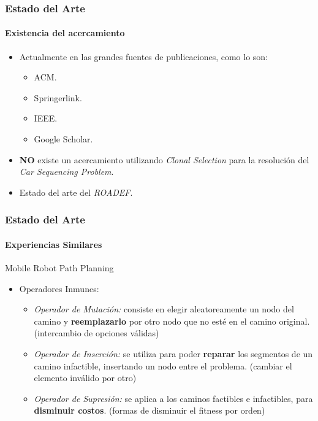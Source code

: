 
\frame
{
\frametitle{Estado del Arte}
\framesubtitle{Existencia del acercamiento}
\begin{itemize}
	\item Actualmente en las grandes fuentes de publicaciones, como lo son:
	\begin{itemize}
		\item ACM.
		\item Springerlink.
		\item IEEE.
		\item Google Scholar.
	\end{itemize}
	\item \textbf{NO} existe un acercamiento utilizando \emph{Clonal Selection}
		para la resolución del \emph{Car Sequencing Problem}.
	\item Estado del arte del \emph{ROADEF}.
\end{itemize}
}

\frame
{
\frametitle{Estado del Arte}
\framesubtitle{Experiencias Similares}
\begin{block}{Mobile Robot Path Planning}
\begin{itemize}
	\item Operadores Inmunes:
	 \begin{itemize}
	 	\item \emph{Operador de Mutación:}
			consiste en elegir aleatoreamente un nodo del camino y \textbf{reemplazarlo} por otro nodo que no esté en el camino original. (intercambio de opciones válidas)
		\item \emph{Operador de Inserción:}
			se utiliza para poder \textbf{reparar} los segmentos de un camino infactible, insertando un nodo entre el problema. (cambiar el elemento inválido por otro)
		\item \emph{Operador de Supresión:}
			se aplica a los caminos factibles e infactibles, para \textbf{disminuir costos}. (formas de disminuir el fitness por orden)
	 \end{itemize}
\end{itemize}
\end{block}
}

